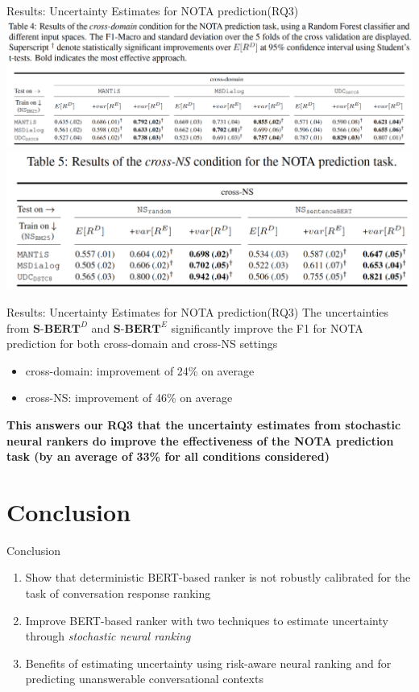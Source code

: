 \documentclass{beamer}
\begin{document}
\begin{frame}{Results: Uncertainty Estimates for NOTA prediction(RQ3)}
    \includegraphics[scale=0.35]{table4.png}
    \includegraphics[scale=0.4]{table5.png}
\end{frame}

\begin{frame}{Results: Uncertainty Estimates for NOTA prediction(RQ3)}
The uncertainties from $\textbf{S-BERT}^D$ and $\textbf{S-BERT}^E$ significantly improve the F1 for NOTA prediction for both cross-domain and cross-NS settings
\begin{itemize}
    \item cross-domain: improvement of 24\% on average
    \item cross-NS: improvement of 46\% on average
\end{itemize}

\textbf{This answers our RQ3 that the uncertainty estimates from stochastic neural rankers do improve the effectiveness of the NOTA prediction task (by an average of 33\% for all conditions considered)}
\end{frame}
\section{Conclusion}
\begin{frame}{Conclusion}
\begin{enumerate}
    \item Show that deterministic BERT-based ranker is not robustly calibrated for the task of conversation response ranking
    \item Improve BERT-based ranker with two techniques to estimate uncertainty through \textsl{stochastic neural ranking}
    \item Benefits of estimating uncertainty using risk-aware neural ranking and for predicting unanswerable conversational contexts
\end{enumerate}
\end{frame}


\end{document}
